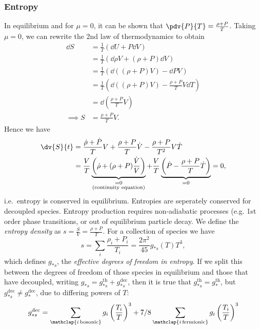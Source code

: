 \documentclass{jknotes}
\begin{document}
\subsubsection*{Entropy}
In equilibrium and for \(\mu = 0\), it can be shown that \(\pdv{P}{T} = \frac{\rho+P}{T}\). Taking \(\mu=0\), we can rewrite the 2nd law of thermodynamics to obtain
\begin{align}
    \dd{S} &= \frac1{T}(\dd{U}+P\dd{V}) \\
           &= \frac1{T}(\dd{\rho}V + (\rho+P)\dd{V}) \\
           &= \frac1{T}(\dd{((\rho+P)V)} - \dd{P}V) \\
           &= \frac1{T}\left(\dd{((\rho+P)V)} - \frac{\rho+P}{T}V\dd{T}\right) \\
           &= \dd{\left(\frac{\rho+P}{T}V\right)} \\
    \implies S &= \frac{\rho+P}{T}V.
\end{align}
Hence we have
\begin{align}
    \dv{S}{t} &= \frac{\dot\rho+\dot{P}}{T}V + \frac{\rho+P}{T}\dot{V} - \frac{\rho+P}{T^2}V\dot{T} \\
              &= \frac{V}{T}\underbrace{\left(\dot{\rho}+(\rho+P)\frac{\dot{V}}{V}\right)}_{\substack{=0\\\text{(continuity equation)}}} + \frac{V}{T}\underbrace{\left(\dot{P} - \frac{\rho+P}{T}\dot{T}\right)}_{=0} = 0,
\end{align}
i.e.\ entropy is conserved in equilibrium. Entropies are seperately conserved for decoupled species. Entropy production requires non-adiabatic processes (e.g. 1st order phase transitions, or out of equilibrium particle decay. We define the \emph{entropy density} as \(s = \frac{S}{V} = \frac{\rho+P}{T}\). For a collection of species we have
\begin{equation}
    s = \sum_i \frac{\rho_i+P_i}{T_i} = \frac{2\pi^2}{45}g_{*s}(T) T^3,
\end{equation}
which defines \(g_{*s}\), the \emph{effective degrees of freedom in entropy}. If we split this between the degrees of freedom of those species in equilibrium and those that have decoupled, writing \(g_{*s} = g_{*s}^{\text{th}} + g_{*s}^{\text{dec}}\), then it is true that \(g_{*s}^{\text{th}} = g_*^{\text{th}}\), but \(g_{*s}^{\text{dec}}\ne g_*^{\text{dec}}\), due to differing powers of \(T\):
\begin{equation}
    g_{*s}^{\text{dec}} = \sum_{\mathclap{i\,\text{bosonic}}}g_i\left(\frac{T_i}{T}\right)^3
    + 7/8 \sum_{\mathclap{i\,\text{fermionic}}}g_i\left(\frac{T_i}{T}\right)^3
\end{equation}
\end{document}
